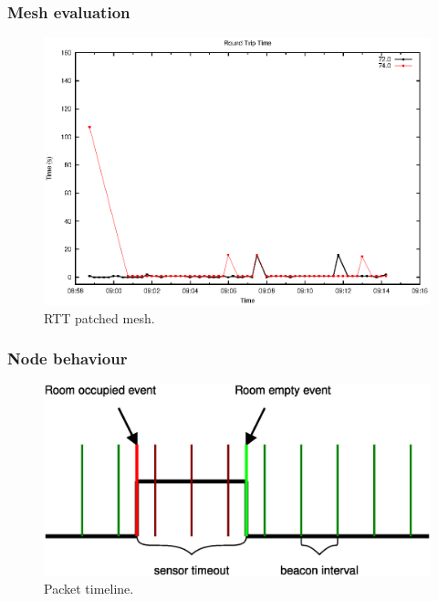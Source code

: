 \documentclass{beamer}
\begin{document}
\begin{frame}
\frametitle{Mesh evaluation}
	
	\begin{center}
		\begin{figure}
			\includegraphics[width=\textwidth]{plot_patched.eps}
			\caption{RTT patched mesh.}
		\end{figure}
	\end{center}
	
\end{frame}

\begin{frame}
\frametitle{Node behaviour}

	\begin{center}
		\begin{figure}
			\includegraphics[width=\textwidth]{sensor.eps}
			\caption{Packet timeline.}
		\end{figure}
	\end{center}

\end{frame}
\end{document}
